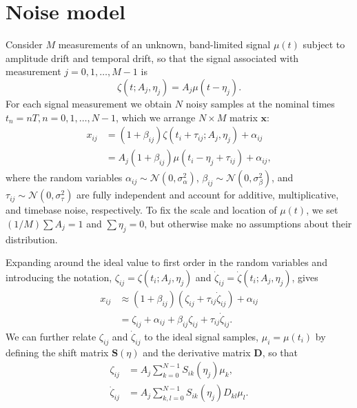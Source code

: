 \documentclass[aps, prb, onecolumn, floatfix, amssymb, superscriptaddress, nofootinbib, longbibliography]{revtex4-2}
\begin{document}
\section{Noise model}
Consider $M$ measurements of an unknown, band-limited signal $\mu(t)$ subject to amplitude drift and temporal drift, so that the signal associated with measurement $j = 0, 1,\ldots, M-1$ is
\begin{equation}
\zeta(t;A_{j},\eta_{j}) = A_{j}\mu(t - \eta_{j}).
\label{eq:zeta}
\end{equation}
For each signal measurement we obtain $N$ noisy samples at the nominal times $t_n = nT, n = 0, 1,\ldots, N-1$, which we arrange $N\times M$ matrix $\mathbf{x}$:
\begin{align}
x_{ij} &= (1 + \beta_{ij})\zeta(t_{i} + \tau_{ij};A_{j},\eta_{j}) + \alpha_{ij} \label{eq:xzeta}\\
&= A_{j}(1 + \beta_{ij})\mu(t_{i} - \eta_{j} + \tau_{ij}) + \alpha_{ij},\label{eq:xmu}
\end{align}
where the random variables $\alpha_{ij}\sim \mathcal{N}(0,\sigma_\alpha^2)$, $\beta_{ij}\sim \mathcal{N}(0,\sigma_\beta^2)$, and $\tau_{ij}\sim \mathcal{N}(0,\sigma_\tau^2)$ are fully independent and account for additive, multiplicative, and timebase noise, respectively. To fix the scale and location of $\mu(t)$, we set $(1/M)\sum A_j = 1$ and $\sum \eta_j = 0$, but otherwise make no assumptions about their distribution.


Expanding around the ideal value to first order in the random variables and introducing the notation, $\zeta_{ij} = \zeta(t_{i};A_{j},\eta_{j})$ and $\dot{\zeta}_{ij} = \dot{\zeta}(t_{i};A_{j},\eta_{j})$, gives
\begin{align}
x_{ij} &\approx (1 + \beta_{ij})(\zeta_{ij} + \tau_{ij}\dot{\zeta}_{ij}) + \alpha_{ij}\nonumber\\
&= \zeta_{ij} + \alpha_{ij} + \beta_{ij}\zeta_{ij} + \tau_{ij}\dot{\zeta}_{ij}.\label{eq:noisemodel}
\end{align}
We can further relate $\zeta_{ij}$ and $\dot{\zeta}_{ij}$ to the ideal signal samples, $\mu_i = \mu(t_i)$ by defining the shift matrix $\mathbf{S}(\eta)$ and the derivative matrix $\mathbf{D}$, so that
\begin{align}
\zeta_{ij} &= A_j\sum_{k=0}^{N-1} S_{ik}(\eta_j)\mu_k,\label{eq:zetaij}\\
\dot{\zeta}_{ij} &= A_j\sum_{k,l=0}^{N-1} S_{ik}(\eta_j)D_{kl}\mu_{l}.\label{eq:zetadotij}
\end{align}
\end{document}
